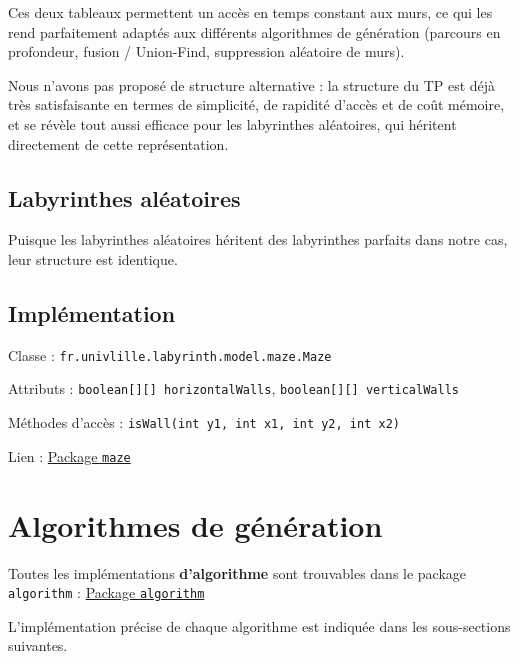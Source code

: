\documentclass{butexFR}
\begin{document}
Ces deux tableaux permettent un accès en temps constant aux murs, ce qui les rend parfaitement adaptés aux différents algorithmes de génération (parcours en profondeur, fusion / Union-Find, suppression aléatoire de murs).

Nous n’avons pas proposé de structure alternative : la structure du TP est déjà très satisfaisante en termes de simplicité, de rapidité d’accès et de coût mémoire, et se révèle tout aussi efficace pour les labyrinthes aléatoires, qui héritent directement de cette représentation.

\subsection{Labyrinthes aléatoires}
Puisque les labyrinthes aléatoires héritent des labyrinthes parfaits dans notre cas, leur structure est identique.

\subsection{Implémentation}

Classe : \texttt{fr.univlille.labyrinth.model.maze.Maze}

Attributs : \texttt{boolean[][] horizontalWalls}, \texttt{boolean[][] verticalWalls}

Méthodes d'accès : \texttt{isWall(int y1, int x1, int y2, int x2)}

Lien : \href{https://gitlab.univ-lille.fr/sae302/2025/G2_SAE3.3/-/tree/master/labyrinth/src/main/java/fr/univlille/labyrinth/model/maze?ref_type=heads}{Package \texttt{maze}}

\newpage

\section{Algorithmes de génération}

Toutes les implémentations \textbf{d'algorithme} sont trouvables dans le package \texttt{algorithm} : \href{https://gitlab.univ-lille.fr/sae302/2025/G2_SAE3.3/-/tree/master/labyrinth/src/main/java/fr/univlille/labyrinth/model/algorithm?ref_type=heads}{Package \texttt{algorithm}}

L'implémentation précise de chaque algorithme est indiquée dans les sous-sections suivantes.

\end{document}
